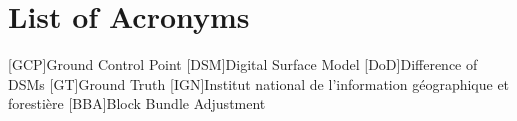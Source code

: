 
\chapter*{List of Acronyms}



\begin{acronym}
	[GCP]{Ground Control Point}
	[DSM]{Digital Surface Model}
	[DoD]{Difference of DSMs}
	[GT]{Ground Truth}
	[IGN]{Institut national de l'information géographique et forestière}
	[BBA]{Block Bundle Adjustment}
\end{acronym}

%
%

